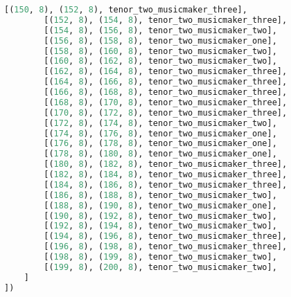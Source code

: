 \begin{lstlisting}[language=Python, caption=Invocation Source Code]
        [(150, 8), (152, 8), tenor_two_musicmaker_three],
        [(152, 8), (154, 8), tenor_two_musicmaker_three],
        [(154, 8), (156, 8), tenor_two_musicmaker_two],
        [(156, 8), (158, 8), tenor_two_musicmaker_one],
        [(158, 8), (160, 8), tenor_two_musicmaker_two],
        [(160, 8), (162, 8), tenor_two_musicmaker_two],
        [(162, 8), (164, 8), tenor_two_musicmaker_three],
        [(164, 8), (166, 8), tenor_two_musicmaker_three],
        [(166, 8), (168, 8), tenor_two_musicmaker_three],
        [(168, 8), (170, 8), tenor_two_musicmaker_three],
        [(170, 8), (172, 8), tenor_two_musicmaker_three],
        [(172, 8), (174, 8), tenor_two_musicmaker_two],
        [(174, 8), (176, 8), tenor_two_musicmaker_one],
        [(176, 8), (178, 8), tenor_two_musicmaker_one],
        [(178, 8), (180, 8), tenor_two_musicmaker_one],
        [(180, 8), (182, 8), tenor_two_musicmaker_three],
        [(182, 8), (184, 8), tenor_two_musicmaker_three],
        [(184, 8), (186, 8), tenor_two_musicmaker_three],
        [(186, 8), (188, 8), tenor_two_musicmaker_two],
        [(188, 8), (190, 8), tenor_two_musicmaker_one],
        [(190, 8), (192, 8), tenor_two_musicmaker_two],
        [(192, 8), (194, 8), tenor_two_musicmaker_two],
        [(194, 8), (196, 8), tenor_two_musicmaker_three],
        [(196, 8), (198, 8), tenor_two_musicmaker_three],
        [(198, 8), (199, 8), tenor_two_musicmaker_two],
        [(199, 8), (200, 8), tenor_two_musicmaker_two],
    ]
])


\end{lstlisting}
